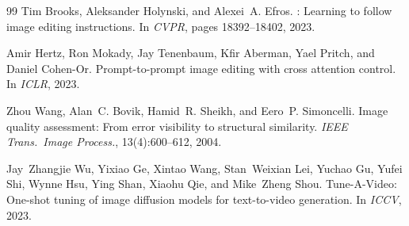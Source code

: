 \documentclass[sigconf]{acmart}
\begin{document}
\begin{thebibliography}{99}
Tim Brooks, Aleksander Holynski, and Alexei~A. Efros.
: Learning to follow image editing instructions.
\newblock In \textit{CVPR}, pages 18392--18402, 2023.

Amir Hertz, Ron Mokady, Jay Tenenbaum, Kfir Aberman, Yael Pritch, and
  Daniel Cohen-Or.
\newblock Prompt-to-prompt image editing with cross attention control.
\newblock In \textit{ICLR}, 2023.

Zhou Wang, Alan~C. Bovik, Hamid~R. Sheikh, and Eero~P. Simoncelli.
\newblock Image quality assessment: From error visibility to structural
  similarity.
\newblock \textit{IEEE Trans.\ Image Process.}, 13(4):600--612, 2004.

Jay~Zhangjie Wu, Yixiao Ge, Xintao Wang, Stan~Weixian Lei, Yuchao Gu,
  Yufei Shi, Wynne Hsu, Ying Shan, Xiaohu Qie, and Mike~Zheng Shou.
\newblock Tune-A-Video: One-shot tuning of image diffusion models for
  text-to-video generation.
\newblock In \textit{ICCV}, 2023.

\end{thebibliography}
\end{document}
